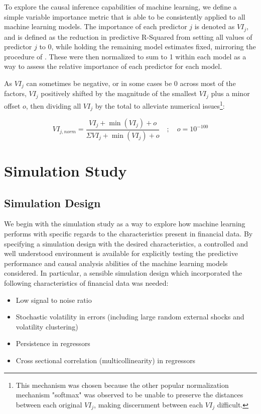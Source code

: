 \documentclass[11pt, a4paper, table]{article}
\newcommand{\smalltodo}[2][] {\todo[caption={#2}, size=\scriptsize,%
	fancyline,#1]{\begin{spacing}{.5}#2\end{spacing}}}
\newcommand{\rhs}[2][]{\smalltodo[color=green!30,#1]{{\bf RS:} #2}}
\begin{document}
To explore the causal inference capabilities of machine learning, we define a simple variable importance metric that is able to be consistently applied to all machine learning models. The importance of each predictor $j$ is denoted as $VI_j$, and is defined as the reduction in predictive R-Squared from setting all values of predictor $j$ to 0, while holding the remaining model estimates fixed, mirroring the procedure of \cite{gu_empirical_2018}. These were then normalized to sum to 1 within each model as a way to assess the relative importance of each predictor for each model. 

As $VI_j$ can sometimes be negative, or in some cases be 0 across most of the factors, $VI_j$ positively shifted by the magnitude of the smallest $VI_j$ plus a minor offset $o$, then dividing all $VI_j$ by the total to alleviate numerical issues\footnote{This mechanism was chosen because the other popular normalization mechanism "softmax" was observed to be unable to preserve the distances between each original $VI_j$, making discernment between each $VI_j$ difficult.}:

\begin{equation}
VI_{j, norm} = \frac{VI_j + \operatorname{min}(VI_j) + o}
{\Sigma VI_j + \operatorname{min}(VI_j) + o} \quad ; \quad o = 10^{-100}
\end{equation}

\newpage

\section{Simulation Study}

\subsection{Simulation Design}

\rhs{motivate this section more clearly}

We begin with the simulation study as a way to explore how machine learning performs with specific regards to the characteristics present in financial data. By specifying a simulation design with the desired characteristics, a controlled and well understood environment is available for explicitly testing the predictive performance and causal analysis abilities of the machine learning models considered. In particular, a sensible simulation design which incorporated the following characteristics of financial data was needed:

\begin{itemize}
\item Low signal to noise ratio
\item Stochastic volatility in errors (including large random external shocks and volatility clustering)
\item Persistence in regressors
\item Cross sectional correlation (multicollinearity) in regressors
\end{itemize}
\end{document}
